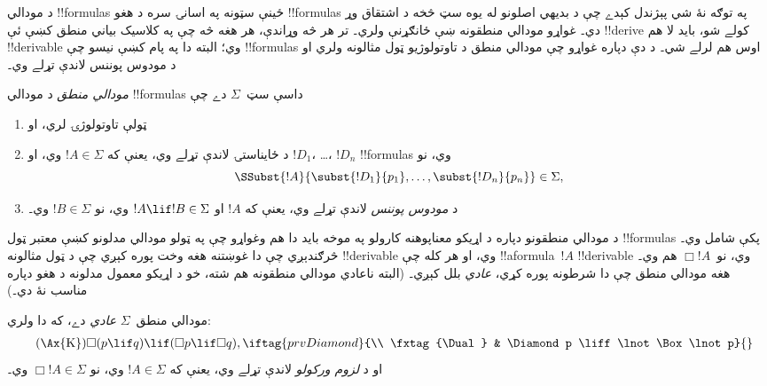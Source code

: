 \documentclass[../../../include/open-logic-section]{subfiles}
\begin{document}


د مودالي !!{formula}s ځينې سټونه په اسانۍ سره د هغو
!!{formula}s په توګه نۀ شي پېژندل کېدے چې د بديهي
اصلونو له يوه سټ څخه د اشتقاق وړ دي۔ غواړو مودالي
منطقونه ښې ځانګړنې ولري۔ تر هر څه وړاندې، هر هغه څه
چې په کلاسيک بياني منطق کښې ئې !!{derive} کولے شو،
بايد لا هم !!{derivable} وي؛ البته دا په پام کښې نيسو
چې !!{formula}s اوس  هم لرلے شي۔
د دې دپاره غواړو چې مودالي منطق د تاوتولوژيو ټول
مثالونه ولري او د مودوس پوننس لاندې تړلے وي۔

\begin{defn}
  \emph{مودالي منطق} د مودالي !!{formula}s داسې
  سټ~$\Sigma$ دے چې
  \begin{enumerate}
  \item ټولې تاوتولوژۍ لري، او
  \item د ځايناستۍ لاندې تړلے وي، يعنې که $!A \in \Sigma$
    وي، او $!D_1$، \dots، $!D_n$ !!{formula}s وي، نو
    \[
    \SSubst{!A}{\subst{!D_1}{p_1}, \dots, \subst{!D_n}{p_n}} \in \Sigma,
    \]
    \item د \emph{مودوس پوننس} لاندې تړلے وي، يعنې که $!A$
      او $!A \lif !B \in \Sigma$ وي، نو $!B \in \Sigma$ وي۔
  \end{enumerate}
\end{defn}

د مودالي منطقونو دپاره د اړيکو معناپوهنه کارولو په
موخه بايد دا هم وغواړو چې په ټولو مودالي مدلونو کښې
معتبر ټول !!{formula}s پکې شامل وي۔ څرګندېږي چې دا
غوښتنه هغه وخت پوره کېږي چې د  ټول مثالونه !!{derivable} وي، او هر کله
چې !!a{formula}~$!A$ !!{derivable} وي، نو~$\Box !A$
هم وي۔ هغه مودالي منطق چې دا شرطونه پوره کړي،
\emph{عادي} بلل کېږي۔ (البته ناعادي مودالي منطقونه هم
شته، خو د اړيکو معمول مدلونه د هغو دپاره مناسب نۀ دي۔)

\begin{defn}
  مودالي منطق~$\Sigma$ \emph{عادي} دے، که دا ولري:
  \begin{align*}
    \tag{\Ax{K}} & \Box(p \lif q) \lif (\Box p \lif \Box q),
    \iftag{prvDiamond}{\\
      \tag{\Dual} & \Diamond p \liff \lnot\Box\lnot p}{}
  \end{align*}
  او د \emph{لزوم ورکولو} لاندې تړلے وي، يعنې که $!A \in
  \Sigma$ وي، نو $\Box !A \in \Sigma$ وي۔
\end{defn}
\end{document}
